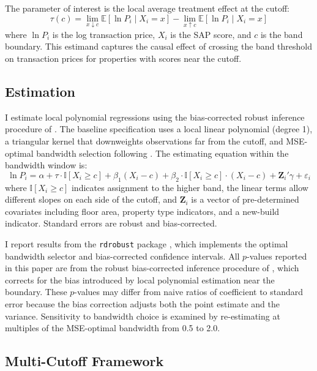 \documentclass[12pt]{article}
\newcommand{\E}{\mathbb{E}}
\newcommand{\ind}{\mathbb{I}}
\begin{document}
The parameter of interest is the local average treatment effect at the cutoff:
\begin{equation}
\tau(c) = \lim_{x \downarrow c} \E[\ln P_i \mid X_i = x] - \lim_{x \uparrow c} \E[\ln P_i \mid X_i = x]
\end{equation}
where $\ln P_i$ is the log transaction price, $X_i$ is the SAP score, and $c$ is the band boundary. This estimand captures the causal effect of crossing the band threshold on transaction prices for properties with scores near the cutoff.

\subsection{Estimation}

I estimate local polynomial regressions using the bias-corrected robust inference procedure of \citet{calonico2014robust}. The baseline specification uses a local linear polynomial (degree 1), a triangular kernel that downweights observations far from the cutoff, and MSE-optimal bandwidth selection following \citet{imbens2012optimal}. The estimating equation within the bandwidth window is:
\begin{equation}
\ln P_i = \alpha + \tau \cdot \ind[X_i \geq c] + \beta_1 (X_i - c) + \beta_2 \cdot \ind[X_i \geq c] \cdot (X_i - c) + \mathbf{Z}_i' \gamma + \varepsilon_i
\end{equation}
where $\ind[X_i \geq c]$ indicates assignment to the higher band, the linear terms allow different slopes on each side of the cutoff, and $\mathbf{Z}_i$ is a vector of pre-determined covariates including floor area, property type indicators, and a new-build indicator. Standard errors are robust and bias-corrected.

I report results from the \texttt{rdrobust} package \citep{cattaneo2019rdrobust}, which implements the optimal bandwidth selector and bias-corrected confidence intervals. All $p$-values reported in this paper are from the robust bias-corrected inference procedure of \citet{calonico2014robust}, which corrects for the bias introduced by local polynomial estimation near the boundary. These $p$-values may differ from naive ratios of coefficient to standard error because the bias correction adjusts both the point estimate and the variance. Sensitivity to bandwidth choice is examined by re-estimating at multiples of the MSE-optimal bandwidth from 0.5 to 2.0.

\subsection{Multi-Cutoff Framework}
\end{document}
